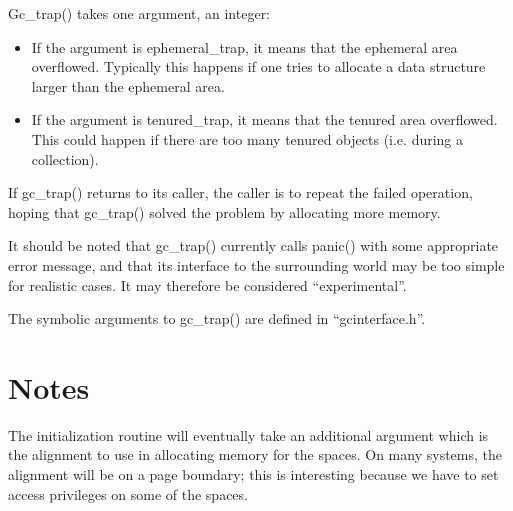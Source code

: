 Gc\_trap() takes one argument, an integer:
\begin{itemize}
\item
If the argument is {\sc ephemeral\_trap}, it means that the ephemeral area 
overflowed. Typically this happens if one tries to allocate a data 
structure larger than the ephemeral area. 

\item
If the argument is {\sc tenured\_trap}, it means that the tenured area
overflowed.  This could happen if there are too many tenured objects
(i.e.  during a collection).
\end{itemize}

If gc\_trap() returns to its caller, the caller is to repeat the failed
operation, hoping that gc\_trap() solved the problem by allocating more
memory.

It should be noted that gc\_trap() currently calls panic() with some
appropriate error message, and that its interface to the surrounding
world may be too simple for realistic cases. It may therefore be considered
``experimental''.

The symbolic arguments to gc\_trap() are defined in ``gcinterface.h''.


\section{Notes}

The initialization routine will eventually take an additional argument
which is the alignment to use in allocating memory for the spaces. On many
systems, the alignment will be on a page boundary; this is interesting
because we have to set access privileges on some of the spaces.

